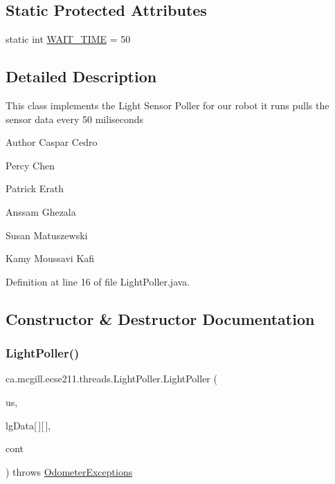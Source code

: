 \subsection*{Static Protected Attributes}
\begin{DoxyCompactItemize}
\item 
static int \hyperlink{classca_1_1mcgill_1_1ecse211_1_1threads_1_1_light_poller_ac3eedf8306835f6592bdbec2f5694651}{W\+A\+I\+T\+\_\+\+T\+I\+ME} = 50
\end{DoxyCompactItemize}


\subsection{Detailed Description}
This class implements the Light Sensor Poller for our robot it runs pulls the sensor data every 50 miliseconds \begin{DoxyAuthor}{Author}
Caspar Cedro 

Percy Chen 

Patrick Erath 

Anssam Ghezala 

Susan Matuszewski 

Kamy Moussavi Kafi 
\end{DoxyAuthor}


Definition at line 16 of file Light\+Poller.\+java.



\subsection{Constructor \& Destructor Documentation}
\mbox{\label{classca_1_1mcgill_1_1ecse211_1_1threads_1_1_light_poller_adc07f842a1cc089195c5e47c2a0e5ee6}} 
\subsubsection{\texorpdfstring{Light\+Poller()}{LightPoller()}}
{\footnotesize\ttfamily ca.\+mcgill.\+ecse211.\+threads.\+Light\+Poller.\+Light\+Poller (\begin{DoxyParamCaption}\item[{Sample\+Provider \mbox{[}$\,$\mbox{]}}]{us,  }\item[{float}]{lg\+Data\mbox{[}$\,$\mbox{]}\mbox{[}$\,$\mbox{]},  }\item[{\hyperlink{classca_1_1mcgill_1_1ecse211_1_1threads_1_1_sensor_data}{Sensor\+Data}}]{cont }\end{DoxyParamCaption}) throws \hyperlink{classca_1_1mcgill_1_1ecse211_1_1odometer_1_1_odometer_exceptions}{Odometer\+Exceptions}}

